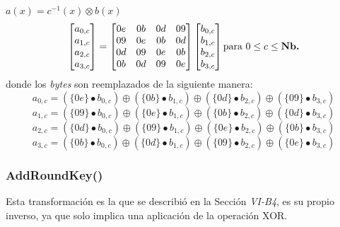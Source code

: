 \documentclass[peerreview]{IEEEtran}
\begin{document}
 $a(x)=c^{-1}(x) \otimes b(x)$
\[ \begin{bmatrix}
	a_{0, c}\\
	a_{1, c}\\
	a_{2, c}\\
	a_{3, c}\\
\end{bmatrix} = \begin{bmatrix}
	0e & 0b & 0d & 09 \\
	09 & 0e & 0b & 0d \\
	0d & 09 & 0e & 0b \\
	0b & 0d & 09 & 0e 
\end{bmatrix} \begin{bmatrix}
	b_{0, c}\\
	b_{1, c}\\
	b_{2, c}\\
	b_{3, c}\\
\end{bmatrix} \text{para } 0 \leq c \leq \text{\textbf{Nb.}}\] donde los \textit{bytes} son reemplazados de la siguiente manera: 
\[a_{0, c}=(\{0e\}\bullet b_{0, c}) \oplus (\{0b\}\bullet b_{1, c}) \oplus (\{0d\}\bullet b_{2, c}) \oplus (\{09\}\bullet b_{3, c})\]
\[a_{1, c}=(\{09\}\bullet b_{0, c}) \oplus (\{0e\}\bullet b_{1, c}) \oplus (\{0b\}\bullet b_{2, c}) \oplus (\{0d\}\bullet b_{3, c})\]
\[a_{2, c}=(\{0d\}\bullet b_{0, c}) \oplus (\{09\}\bullet b_{1, c}) \oplus (\{0e\}\bullet b_{2, c}) \oplus (\{0b\}\bullet b_{3, c})\]
\[a_{3, c}=(\{0b\}\bullet b_{0, c}) \oplus (\{0d\}\bullet b_{1, c}) \oplus (\{09\}\bullet b_{2, c}) \oplus (\{0e\}\bullet b_{3, c})\]

\subsubsection{AddRoundKey()} Esta transformación es la  que se describió en la Sección \textit{VI-B4}, es su propio inverso, ya que solo implica una aplicación de la operación XOR.\\
\end{document}
